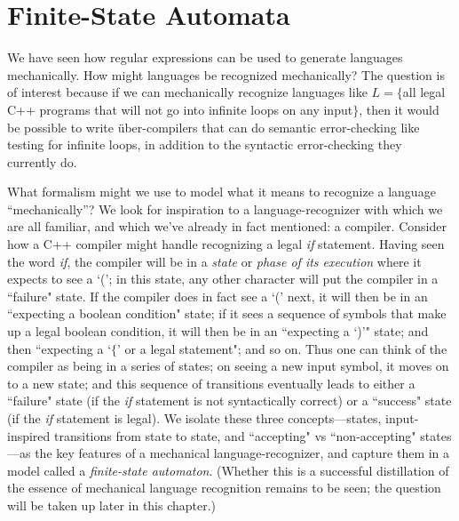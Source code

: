 \newcommand{\dstar}{\delta^*}
\newcommand{\pstar}{\partial^*}
\newcommand{\winss}{w \in \Sigma^*}

\section{Finite-State Automata}\label{S-fsa-1}

We have seen how regular expressions can be used to generate languages
mechanically. How might languages be recognized mechanically? 
The question is of interest because if we can mechanically recognize languages
like $L= \{$all legal C++ programs that will not go into infinite loops on any
input$\}$, then it would be possible to write \"uber-compilers that can do
semantic error-checking like testing for infinite loops, in addition to the
syntactic error-checking they currently do.

What formalism might we use to model what it means to recognize a language
``mechanically''?  We look for inspiration to a language-recognizer with which
we are all familiar, and which we've already in fact mentioned: a compiler.
Consider how a C++ compiler might handle recognizing a legal {\em if}
statement.  Having seen the word {\em if}, the compiler will be in a {\em state}
or {\em phase of its execution} where it expects to see a `('; in this state,
any other character will put the compiler in a ``failure" state.  If the compiler
does in fact see a `(' next, it will then be in an ``expecting a boolean
condition" state; if it sees a sequence of symbols that make up a legal boolean
condition, it will then be in an ``expecting a `)'" state; and then ``expecting
a `$\{$' or a legal statement"; and so on.  Thus one can think of the compiler as
being in a series of states; on seeing a new input symbol, it moves on to a new
state; and this sequence of transitions eventually leads to either a ``failure"
state (if the {\em if} statement is not syntactically correct) or a ``success"
state (if the {\em if} statement is legal).  We isolate these three
concepts---states, input-inspired transitions from state to state, and
``accepting" vs ``non-accepting" states---as the key features of a mechanical
language-recognizer, and capture them in a model called a {\em finite-state
automaton}.  (Whether this is a successful distillation of the essence of
mechanical language recognition remains to be seen; the question will be taken
up later in this chapter.)

